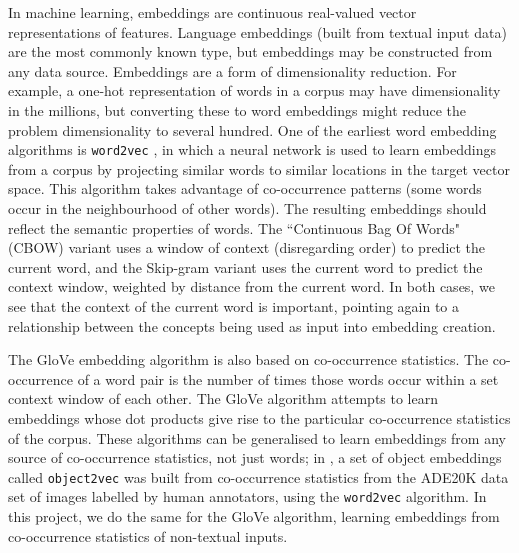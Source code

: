 In machine learning, embeddings are continuous real-valued vector representations of features. Language embeddings (built from textual input data) are the most commonly known type, but embeddings may be constructed from any data source. Embeddings are a form of dimensionality reduction. For example, a one-hot representation of words in a corpus may have dimensionality in the millions, but converting these to word embeddings might reduce the problem dimensionality to several hundred. One of the earliest word embedding algorithms is \texttt{word2vec} \cite{word2vec}, in which a neural network is used to learn embeddings from a corpus by projecting similar words to similar locations in the target vector space. This algorithm takes advantage of co-occurrence patterns (some words occur in the neighbourhood of other words). The resulting embeddings should reflect the semantic properties of words. The ``Continuous Bag Of Words" (CBOW) variant uses a window of context (disregarding order) to predict the current word, and the Skip-gram variant uses the current word to predict the context window, weighted by distance from the current word. In both cases, we see that the context of the current word is important, pointing again to a relationship between the concepts being used as input into embedding creation. 

The GloVe \cite{pennington2014glove} embedding algorithm is also based on co-occurrence statistics. The co-occurrence of a word pair is the number of times those words occur within a set context window of each other. The GloVe algorithm attempts to learn embeddings whose dot products give rise to the particular co-occurrence statistics of the corpus. These algorithms can be generalised to learn embeddings from any source of co-occurrence statistics, not just words; in \cite{CoocurrenceVisionLanguage2021}, a set of object embeddings called \texttt{object2vec} was built from co-occurrence statistics from the ADE20K data set \cite{ADE20K} of images labelled by human annotators, using the \texttt{word2vec} algorithm. In this project, we do the same for the GloVe algorithm, learning embeddings from co-occurrence statistics of non-textual inputs. 


